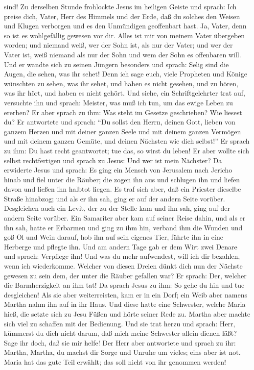sind!  Zu derselben Stunde frohlockte Jesus im heiligen
Geiste und sprach: Ich preise dich, Vater, Herr des Himmels und der
Erde, daß du solches den Weisen und Klugen verborgen und es den
Unmündigen geoffenbart hast. Ja, Vater, denn so ist es wohlgefällig
gewesen vor dir.  Alles ist mir von meinem Vater
übergeben worden; und niemand weiß, wer der Sohn ist, als nur der Vater;
und wer der Vater ist, weiß niemand als nur der Sohn und wem der Sohn es
offenbaren will.  Und er wandte sich zu seinen Jüngern
besonders und sprach: Selig sind die Augen, die sehen, was ihr sehet!
 Denn ich sage euch, viele Propheten und Könige wünschten
zu sehen, was ihr sehet, und haben es nicht gesehen, und zu hören, was
ihr hört, und haben es nicht gehört.  Und siehe, ein
Schriftgelehrter trat auf, versuchte ihn und sprach: Meister, was muß
ich tun, um das ewige Leben zu ererben?  Er aber sprach
zu ihm: Was steht im Gesetze geschrieben? Wie liesest du?
 Er antwortete und sprach: ``Du sollst den Herrn, deinen
Gott, lieben von ganzem Herzen und mit deiner ganzen Seele und mit
deinem ganzen Vermögen und mit deinem ganzen Gemüte, und deinen Nächsten
wie dich selbst!''  Er sprach zu ihm: Du hast recht
geantwortet; tue das, so wirst du leben!  Er aber wollte
sich selbst rechtfertigen und sprach zu Jesus: Und wer ist mein
Nächster?  Da erwiderte Jesus und sprach: Es ging ein
Mensch von Jerusalem nach Jericho hinab und fiel unter die Räuber; die
zogen ihn aus und schlugen ihn und liefen davon und ließen ihn halbtot
liegen.  Es traf sich aber, daß ein Priester dieselbe
Straße hinabzog; und als er ihn sah, ging er auf der andern Seite
vorüber.  Desgleichen auch ein Levit, der zu der Stelle
kam und ihn sah, ging auf der andern Seite vorüber.  Ein
Samariter aber kam auf seiner Reise dahin, und als er ihn sah, hatte er
Erbarmen  und ging zu ihm hin, verband ihm die Wunden und
goß Öl und Wein darauf, hob ihn auf sein eigenes Tier, führte ihn in
eine Herberge und pflegte ihn.  Und am andern Tage gab er
dem Wirt zwei Denare und sprach: Verpflege ihn! Und was du mehr
aufwendest, will ich dir bezahlen, wenn ich wiederkomme. 
Welcher von diesen Dreien dünkt dich nun der Nächste gewesen zu sein
dem, der unter die Räuber gefallen war?  Er sprach: Der,
welcher die Barmherzigkeit an ihm tat! Da sprach Jesus zu ihm: So gehe
du hin und tue desgleichen!  Als sie aber weiterreisten,
kam er in ein Dorf; ein Weib aber namens Martha nahm ihn auf in ihr
Haus.  Und diese hatte eine Schwester, welche Maria hieß,
die setzte sich zu Jesu Füßen und hörte seiner Rede zu. 
Martha aber machte sich viel zu schaffen mit der Bedienung. Und sie trat
herzu und sprach: Herr, kümmerst du dich nicht darum, daß mich meine
Schwester allein dienen läßt? Sage ihr doch, daß sie mir helfe!
 Der Herr aber antwortete und sprach zu ihr: Martha,
Martha, du machst dir Sorge und Unruhe um vieles;  eins
aber ist not. Maria hat das gute Teil erwählt; das soll nicht von ihr
genommen werden!

